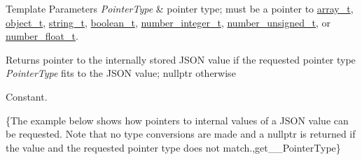 \begin{DoxyTemplParams}{Template Parameters}
{\em Pointer\-Type} & pointer type; must be a pointer to \hyperlink{classnlohmann_1_1basic__json_ab00b882d39306d663c23dab110f5cae0}{array\-\_\-t}, \hyperlink{classnlohmann_1_1basic__json_a0ac9894c9de8dc551cf2e5f1c605537f}{object\-\_\-t}, \hyperlink{classnlohmann_1_1basic__json_ab63e618bbb0371042b1bec17f5891f42}{string\-\_\-t}, \hyperlink{classnlohmann_1_1basic__json_af3bc3e83aa162d7ba4df16a949872723}{boolean\-\_\-t}, \hyperlink{classnlohmann_1_1basic__json_ac4b10b2364f26ce47bdb9a413ff04a59}{number\-\_\-integer\-\_\-t}, \hyperlink{classnlohmann_1_1basic__json_a60a04166c122072ab11eaf9845d9cd1d}{number\-\_\-unsigned\-\_\-t}, or \hyperlink{classnlohmann_1_1basic__json_a74a0013e847fdc574b48f931f0e757e1}{number\-\_\-float\-\_\-t}.\\
\hline
\end{DoxyTemplParams}
\begin{DoxyReturn}{Returns}
pointer to the internally stored J\-S\-O\-N value if the requested pointer type {\itshape Pointer\-Type} fits to the J\-S\-O\-N value; {\ttfamily nullptr} otherwise
\end{DoxyReturn}
Constant.

\{The example below shows how pointers to internal values of a J\-S\-O\-N value can be requested. Note that no type conversions are made and a {\ttfamily nullptr} is returned if the value and the requested pointer type does not match.,get\-\_\-\-\_\-\-Pointer\-Type\}

